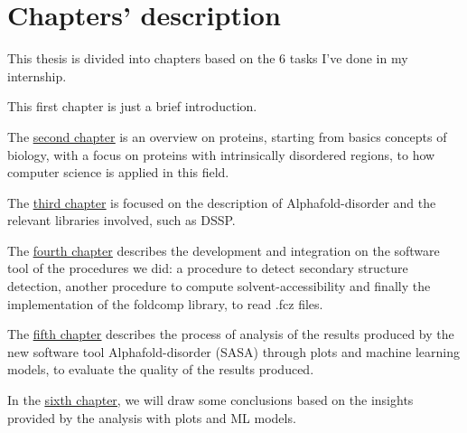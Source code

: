 \section{Chapters' description}
This thesis is divided into chapters based on the 6 tasks I've done in my internship.

This first chapter is just a brief introduction.

The \underline{\hyperref[chp:proteins]{second chapter}} is an overview on proteins, starting from basics concepts of biology, with a focus on proteins with intrinsically disordered regions, to how computer science is applied in this field.

The \underline{\hyperref[chp:alphafold-disorder]{third chapter}} is focused on the description of Alphafold-disorder and the relevant libraries involved, such as DSSP.

The \underline{\hyperref[chp:development]{fourth chapter}} describes the development and integration on the software tool of the procedures we did: a procedure to detect secondary structure detection, another procedure to compute solvent-accessibility and finally the implementation of the foldcomp library, to read .fcz files.




The \underline{\hyperref[chp:analysis]{fifth chapter}} describes the process of analysis of the results produced by the new software tool Alphafold-disorder (SASA) through plots and machine learning models, to evaluate the quality of the results produced.

In the \underline{\hyperref[chp:conclusions]{sixth chapter}}, we will draw some conclusions based on the insights provided by the analysis with plots and ML models.

